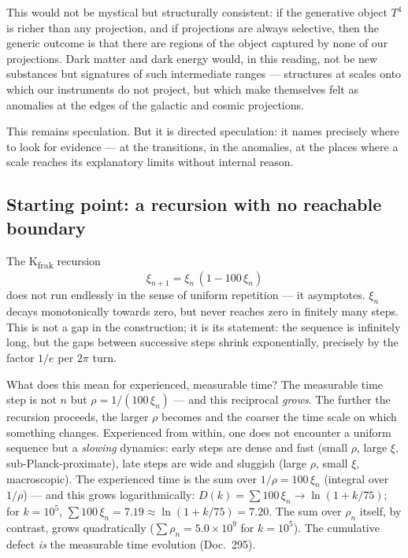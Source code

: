 This would not be mystical but structurally consistent: if the generative
object $T^4$ is richer than any projection, and if projections are always
selective, then the generic outcome is that there are regions of the object
captured by none of our projections. Dark matter and dark energy would, in
this reading, not be new substances but signatures of such intermediate
ranges --- structures at scales onto which our instruments do not project, but
which make themselves felt as anomalies at the edges of the galactic and
cosmic projections.

This remains speculation. But it is directed speculation: it names precisely
where to look for evidence --- at the transitions, in the anomalies, at the
places where a scale reaches its explanatory limits without internal reason.

\subsection*{Starting point: a recursion with no reachable boundary}

The K\textsubscript{frak} recursion
\begin{equation}
  \xi_{n+1} = \xi_n\,(1 - 100\,\xi_n)
\end{equation}
does not run endlessly in the sense of uniform repetition --- it
asymptotes. $\xi_n$ decays monotonically towards zero, but never reaches zero
in finitely many steps. This is not a gap in the construction; it is its
statement: the sequence is infinitely long, but the gaps between successive
steps shrink exponentially, precisely by the factor $1/e$ per $2\pi$ turn.

What does this mean for experienced, measurable time? The measurable time
step is not $n$ but $\rho = 1/(100\,\xi_n)$ --- and this reciprocal
\emph{grows}. The further the recursion proceeds, the larger $\rho$ becomes
and the coarser the time scale on which something changes. Experienced from
within, one does not encounter a uniform sequence but a \emph{slowing}
dynamics: early steps are dense and fast (small $\rho$, large $\xi$,
sub-Planck-proximate), late steps are wide and sluggish (large $\rho$, small
$\xi$, macroscopic). The experienced time is the sum over $1/\rho = 100\,\xi_n$
(integral over $1/\rho$) --- and this grows logarithmically: $D(k) = \sum 100\,\xi_n \to
\ln(1 + k/75)$; for $k = 10^5$, $\sum 100\,\xi_n = 7.19 \approx
\ln(1+k/75) = 7.20$. The sum over $\rho_n$ itself, by contrast, grows
quadratically ($\sum\rho_n = 5.0\times10^9$ for $k = 10^5$). The cumulative defect \emph{is} the measurable time evolution
(Doc.~295).

